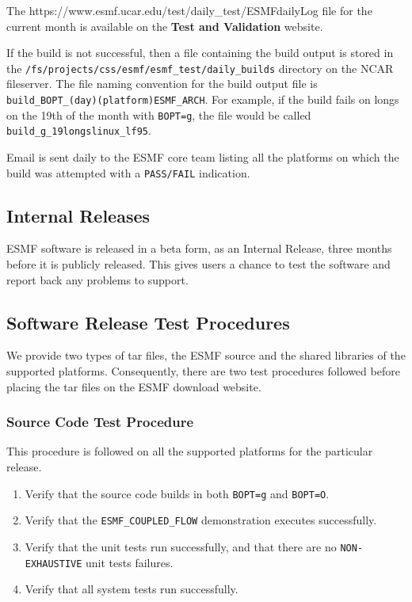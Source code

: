 The 
{https://www.esmf.ucar.edu/test/daily\_test/ESMFdailyLog} file for the current month is available on the {\bf Test and Validation} website.

If the build is not successful, then a file containing the build output is stored in 
the {\tt /fs/projects/css/esmf/esmf\_test/daily\_builds} directory on the NCAR fileserver. The file naming convention for the build output file is 
{\tt build\_BOPT\_(day)(platform)ESMF\_ARCH}. For example, if the build fails on longs on the 19th of the month with {\tt BOPT=g}, the file would be called {\tt build\_g\_19longslinux\_lf95}. 

Email is sent daily to the ESMF core team listing all the platforms on which the build was attempted with a {\tt PASS/FAIL} indication. 

\subsection{Internal Releases}

ESMF software is released in a beta form, as an Internal Release,
three months before it is publicly released.  This gives users
a chance to test the software and report back any problems to 
support.

\subsection{Software Release Test Procedures}

We provide two types of tar files, the ESMF source and the shared libraries of 
the supported platforms. Consequently, there are two test procedures followed before placing the 
tar files on the ESMF download website. 

\subsubsection{Source Code Test Procedure}

This procedure is followed on all the supported platforms for the particular release.

\begin{enumerate}
\item Verify that the source code builds in both {\tt BOPT=g} and {\tt BOPT=O}.
\item Verify that  the {\tt ESMF\_COUPLED\_FLOW} demonstration executes successfully.
\item Verify that the unit tests run successfully, and that there are no {\tt NON-EXHAUSTIVE} unit tests  failures.
\item Verify that all system tests run successfully. 
\end{enumerate}


